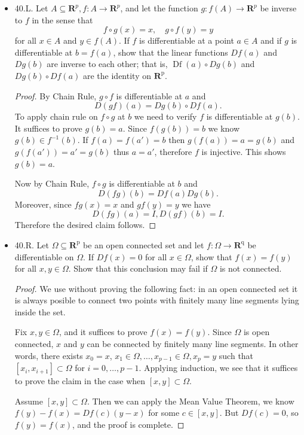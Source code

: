 \begin{itemize}
\item 40.L. Let $A \subseteq \boldsymbol{R}^p, f: A \rightarrow \boldsymbol{R}^p$, and let the function $g: f(A) \rightarrow \boldsymbol{R}^p$ be inverse to $f$ in the sense that
\[
f \circ g(x)=x, \quad g \circ f(y)=y
\]
for all $x \in A$ and $y \in f(A)$. If $f$ is differentiable at a point $a \in A$ and if $g$ is differentiable at $b=f(a)$, show that the linear functions $D f(a)$ and $D g(b)$ are inverse to each other; that is, $\operatorname{Df}(a) \circ D g(b)$ and $D g(b) \circ D f(a)$ are the identity on $\boldsymbol{R}^{\mathrm{p}}$.
\begin{proof}
	By Chain Rule,  $g \circ f$ is differentiable at $a$ and
	\[
		D (gf) (a) = Dg(b) \circ Df(a)
	.\] 
	To apply chain rule on $f \circ g$ at $b$ we need to verify $f$ is differentiable at $g(b)$. It suffices to prove $g(b) = a$. Since $f(g(b)) = b$ we know $g(b) \in f^{-1} (b)$. If $f(a) = f(a') = b$ then  $g(f(a)) = a = g(b)$ and $g(f(a') ) = a' = g(b)$ thus $a = a'$, therefore $f$ is injective. This shows $g(b) = a$.

	Now by Chain Rule, $f \circ g$ is differentiable at $b$ and 
	\[
		D(fg) (b) = Df(a) Dg(b)
	.\] 
	Moreover, since $fg(x) = x$ and $gf(y) = y$ we have
	\[
		D(fg)(a) = I, D(gf)(b) = I
	.\] 
	Therefore the desired claim follows.
\end{proof}

\item 40.R. Let $\Omega \subseteq \boldsymbol{R}^{\mathrm{p}}$ be an open connected set and let $f: \Omega \rightarrow \mathbf{R}^{\mathrm{q}}$ be differentiable on $\Omega$. If $D f(x)=0$ for all $x \in \Omega$, show that $f(x)=f(y)$ for all $x, y \in \Omega$. Show that this conclusion may fail if $\Omega$ is not connected.
\begin{proof}
	We use without proving the following fact: in an open connected set it is always posible to connect two points with finitely many line segments lying inside the set.

	Fix $x, y \in \Omega$, and it suffices to prove $f(x) = f(y)$. Since $\Omega$ is open connected, $x$ and $y$ can be connected by finitely many line segments. In other words, there exists $x_0 = x$, $x_1 \in \Omega, \ldots, x_{p-1} \in \Omega, x_p = y$ such that $[x_i, x_{i+1}] \subset \Omega$ for $i = 0, \ldots, p-1$. Applying induction, we see that it suffices to prove the claim in the case when $[x,y] \subset \Omega$. 

	Assume $[x,y] \subset \Omega$. Then we can apply the Mean Value Theorem, we know $f(y) - f(x) = Df(c) (y - x)$ for some $c \in [x,y]$. But $Df(c) = 0$, so $f(y) = f(x)$, and the proof is complete.


\end{proof}
\end{itemize}
